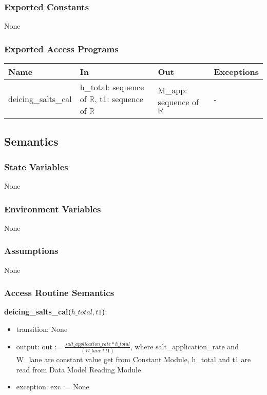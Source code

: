 \documentclass[12pt, titlepage]{article}
\begin{document}
\subsubsection{Exported Constants}
None
\subsubsection{Exported Access Programs}

\begin{center}
\begin{tabular}{p{3.5cm} p{4.5cm} p{4.5cm} p{2cm}}
\hline
\textbf{Name} & \textbf{In} & \textbf{Out} & \textbf{Exceptions} \\
\hline
deicing\_salts\_cal & h\_total: sequence of $\mathbb{R}$, t1: sequence of $\mathbb{R}$ & M\_app: sequence of $\mathbb{R}$ & - \\
\hline
\end{tabular}
\end{center}

\subsection{Semantics}

\subsubsection{State Variables}
None
\subsubsection{Environment Variables}
None
\subsubsection{Assumptions}
None
\subsubsection{Access Routine Semantics}
\noindent \textbf{deicing\_salts\_cal($h\_total, t1$)}:
\begin{itemize}
\item transition: None
\item output: out :=  $\frac{salt\_application\_rate*h\_total}{ (W\_lane*t1)}$, where salt\_application\_rate and W\_lane are constant value get from Constant Module, h\_total and t1 are read from Data Model Reading Module
\item exception: exc := None
\end{itemize}
\end{document}
